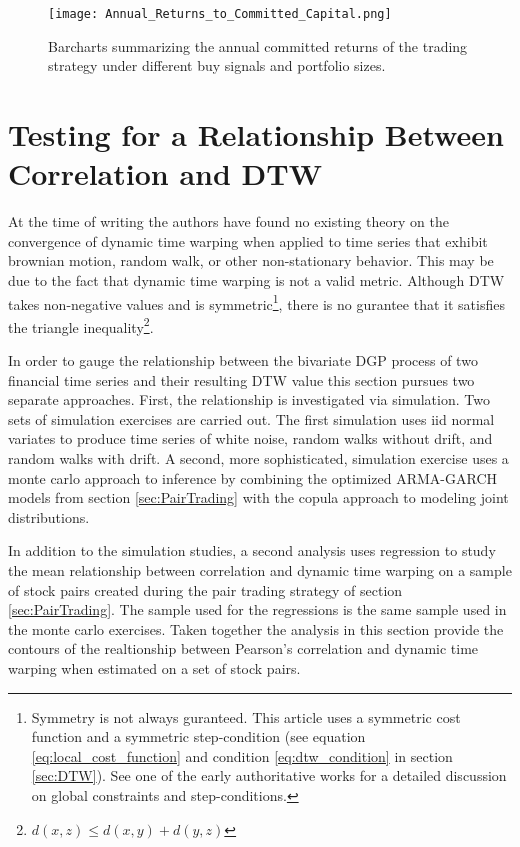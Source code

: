 \documentclass[12pt]{article}
\begin{document}
\begin{landscape}
    \begin{figure}[hp]
        \texttt{[image: Annual\_Returns\_to\_Committed\_Capital.png]}
        \caption{Barcharts summarizing the annual committed returns of the trading strategy under different buy signals and portfolio sizes.}
        \label{fig:annual_returns_to_committed_capital_by_buy_signal}
    \end{figure}
\end{landscape}

\section{Testing for a Relationship Between Correlation and DTW} \label{sec:Corr_and_DTW_Relationship}

At the time of writing the authors have found no existing theory on the convergence of dynamic time warping when applied to time series that exhibit brownian motion, random walk, or other non-stationary behavior. This may be due to the fact that dynamic time warping is not a valid metric. Although DTW takes non-negative values and is symmetric\footnote{Symmetry is not always guranteed. This article uses a symmetric cost function and a symmetric step-condition (see equation \ref{eq:local_cost_function} and condition \ref{eq:dtw_condition} in section \ref{sec:DTW}). See one of the early authoritative works \cite{SakoeChiba_IEEE_1978} for a detailed discussion on global constraints and step-conditions.}, there is no gurantee that it satisfies the triangle inequality\footnote{$d(x, z) \leq d(x, y) + d(y, z)$}. 

In order to gauge the relationship between the bivariate DGP process of two financial time series and their resulting DTW value this section pursues two separate approaches. First, the relationship is investigated via simulation. Two sets of simulation exercises are carried out. The first simulation uses iid normal variates to produce time series of white noise, random walks without drift, and random walks with drift. A second, more sophisticated, simulation exercise uses a monte carlo approach to inference by combining the optimized ARMA-GARCH models from section \ref{sec:PairTrading} with the copula approach to modeling joint distributions.

In addition to the simulation studies, a second analysis uses regression to study the mean relationship between correlation and dynamic time warping on a sample of stock pairs created during the pair trading strategy of section \ref{sec:PairTrading}. The sample used for the regressions is the same sample used in the monte carlo exercises. Taken together the analysis in this section provide the contours of the realtionship between Pearson's correlation and dynamic time warping when estimated on a set of stock pairs. 
\end{document}
